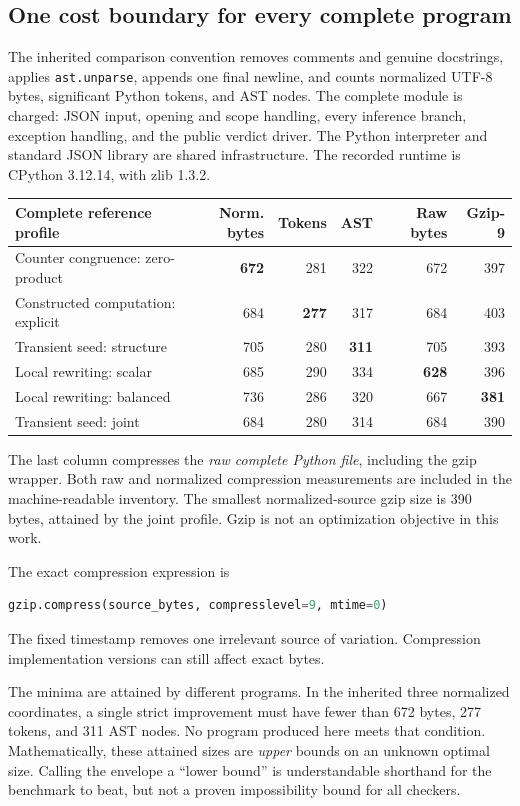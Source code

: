 \documentclass[11pt]{article}
\newcommand{\file}[1]{\texttt{\nolinkurl{#1}}}
\begin{document}
\subsection{One cost boundary for every complete program}

The inherited comparison convention removes comments and genuine
docstrings, applies \file{ast.unparse}, appends one final newline, and counts
normalized UTF-8 bytes, significant Python tokens, and AST nodes. The
complete module is charged: JSON input, opening and scope handling, every
inference branch, exception handling, and the public verdict driver.
The Python interpreter and standard JSON library are shared infrastructure.
The recorded runtime is CPython 3.12.14, with zlib 1.3.2.

\begin{center}\small
\begin{tabular}{lrrrrr}
\toprule
Complete reference profile & Norm. bytes & Tokens & AST & Raw bytes & Gzip-9\\
\midrule
Counter congruence: zero-product &\textbf{672}&281&322&672&397\\
Constructed computation: explicit &684&\textbf{277}&317&684&403\\
Transient seed: structure &705&280&\textbf{311}&705&393\\
Local rewriting: scalar &685&290&334&\textbf{628}&396\\
Local rewriting: balanced &736&286&320&667&\textbf{381}\\
Transient seed: joint &684&280&314&684&390\\
\bottomrule
\end{tabular}
\end{center}

The last column compresses the \emph{raw complete Python file}, including
the gzip wrapper. Both raw and normalized compression measurements are
included in the machine-readable inventory. The smallest normalized-source
gzip size is 390 bytes, attained by the joint profile. Gzip is not an
optimization objective in this work.

The exact compression expression is
\begin{lstlisting}[language=Python]
gzip.compress(source_bytes, compresslevel=9, mtime=0)
\end{lstlisting}
The fixed timestamp removes one irrelevant source of variation. Compression
implementation versions can still affect exact bytes.

The minima are attained by different programs. In the inherited three
normalized coordinates, a single strict improvement must have fewer than
672 bytes, 277 tokens, and 311 AST nodes. No program produced here meets
that condition. Mathematically, these attained sizes are \emph{upper}
bounds on an unknown optimal size. Calling the envelope a ``lower bound''
is understandable shorthand for the benchmark to beat, but not a proven
impossibility bound for all checkers.
\end{document}
